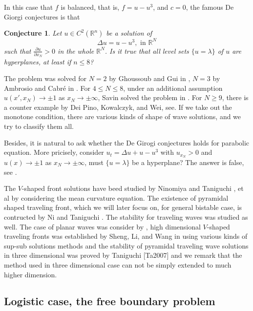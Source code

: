 \documentclass[12pt, a4paper]{article}
\newtheorem{conj}[thm]{Conjecture}
\numberwithin{equation}{section}
\newcommand{\R}{\mathbb{R}}
\newcommand{\pd}[2]{\frac{\partial #1}{\partial #2}}
\begin{document}
\begin{CJK}{UTF8}{bkai}
	In this case that $f$ is balanced, that is, $f=u-u^3$, and $c=0$, the famous De Giorgi conjectures is that
\begin{conj}\cite{DG1979}
Let $u\in C^2(\R^n)$ be a solution of
\begin{equation}
	\Delta u =u-u^3,\mbox{ in }\R^N
\end{equation}
such that $\pd{u}{x_N}>0$ in the whole $\R^N$. Is it true that all level sets $\{u=\lambda\}$ of $u$ are hyperplanes, at least
if $n\leq 8$?
\end{conj}

	The problem was solved for $N=2$ by Ghoussoub and Gui in \cite{GG1998}, $N=3$ by Ambrosio and  Cabr\'e in \cite{AC2000}. For $4\leq N\leq 8$, under an additional assumption $u(x',x_N)\to\pm 1$ as $x_N\to\pm\infty$, Savin solved the problem in \cite{Sa2009}. For $N\geq 9$, there is a counter example by Dei Pino, Kowalczyk, and Wei, see\cite{DKW2008}. If we take out the monotone condition, there are various kinds of shape of wave solutions, and we try to classify them all.

	Besides, it is natural to ask whether the De Girogi conjectures holds for parabolic equation. More pricisely, consider $u_t=\Delta u+u-u^3$ with $u_{x_N}>0$ and $u(x)\to\pm1$ as $x_N\to\pm\infty$, must $\{u=\lambda\}$ be a hyperplane? The answer is false, see \cite{CGHNR2004}. 

	The $V$-shaped front solutions have beed studied by Ninomiya and Taniguchi \cite{NT2005, NT2006}, et al by considering the mean curvature equation. The existence of  pyramidal shaped traveling front, which we will later focus on, for general bistable case, is contructed by Ni and Taniguchi \cite{NT2013}. The stability for traveling waves was studied as well. The case of planar waves was consider by \cite{LX1992,MNT2009}, high dimensional $V$-shaped traveling fronts was established by Sheng, Li, and Wang in \cite{CLW2013} using various kinds of sup-sub solutions methods and the stability of pyramidal traveling wave solutions in three dimensional was proved by Taniguchi [Ta2007] and we remark that the method used in three dimensional case can not be simply extended to much higher dimension.

\subsection{Logistic case, the free boundary problem}


\end{CJK}
\end{document}
